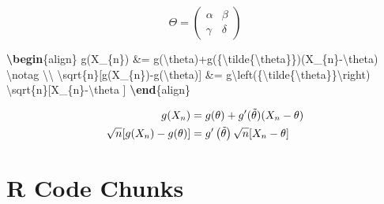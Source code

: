 \documentclass[
  11pt,
]{krantz}
\newenvironment{Shaded}{\begin{snugshade}}{\end{snugshade}}
\newcommand{\ExtensionTok}[1]{#1}
\newcommand{\KeywordTok}[1]{\textcolor[rgb]{0.27,0.27,0.27}{\textbf{#1}}}
\newcommand{\NormalTok}[1]{#1}
\newcommand{\SpecialCharTok}[1]{\textcolor[rgb]{0,0,0}{#1}}
\newcommand{\SpecialStringTok}[1]{\textcolor[rgb]{0.5,0.5,0.5}{#1}}
\begin{document}
\[\Theta = \begin{pmatrix}\alpha & \beta\\
\gamma & \delta
\end{pmatrix}\]

\begin{Shaded}
\begin{Highlighting}[]
\SpecialStringTok{$$}\KeywordTok{\textbackslash{}begin}\NormalTok{\{}\ExtensionTok{align}\NormalTok{\}}\SpecialStringTok{ }
\SpecialStringTok{g(X\_\{n\}) \&= g(}\SpecialCharTok{\textbackslash{}theta}\SpecialStringTok{)+g\textquotesingle{}(\{}\SpecialCharTok{\textbackslash{}tilde}\SpecialStringTok{\{}\SpecialCharTok{\textbackslash{}theta}\SpecialStringTok{\}\})(X\_\{n\}{-}}\SpecialCharTok{\textbackslash{}theta}\SpecialStringTok{) }\SpecialCharTok{\textbackslash{}notag}\SpecialStringTok{ }\SpecialCharTok{\textbackslash{}\textbackslash{}}
\SpecialCharTok{\textbackslash{}sqrt}\SpecialStringTok{\{n\}[g(X\_\{n\}){-}g(}\SpecialCharTok{\textbackslash{}theta}\SpecialStringTok{)] \&= g\textquotesingle{}}\SpecialCharTok{\textbackslash{}left}\SpecialStringTok{(\{}\SpecialCharTok{\textbackslash{}tilde}\SpecialStringTok{\{}\SpecialCharTok{\textbackslash{}theta}\SpecialStringTok{\}\}}\SpecialCharTok{\textbackslash{}right}\SpecialStringTok{)}
\SpecialStringTok{  }\SpecialCharTok{\textbackslash{}sqrt}\SpecialStringTok{\{n\}[X\_\{n\}{-}}\SpecialCharTok{\textbackslash{}theta}\SpecialStringTok{ ]}
\KeywordTok{\textbackslash{}end}\NormalTok{\{}\ExtensionTok{align}\NormalTok{\}}\SpecialStringTok{$$}
\end{Highlighting}
\end{Shaded}

\[\begin{aligned} 
g(X_{n}) &= g(\theta)+g'({\tilde{\theta}})(X_{n}-\theta) \notag \\
\sqrt{n}[g(X_{n})-g(\theta)] &= g'\left({\tilde{\theta}}\right)
  \sqrt{n}[X_{n}-\theta ]
\end{aligned}\]

\hypertarget{r-code-chunks}{%
\section{R Code Chunks}\label{r-code-chunks}}
\end{document}

